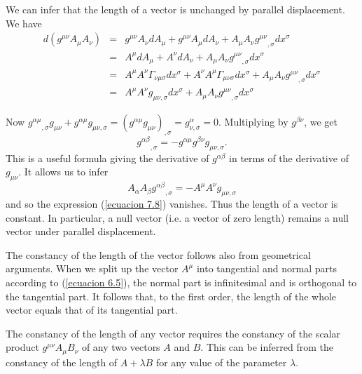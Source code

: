 We can infer that the length of a vector is unchanged by parallel displacement. 
We have
\begin{equation}
 \label{ecuacion 7.8}
 \begin{array}{rcl}
 d\left( g^{\mu\nu} A_\mu A_\nu \right) & = & 
    g^{\mu\nu} A_\nu d A_\mu + g^{\mu\nu} A_\mu d A_\nu + A_\mu A_\nu  
    {g^{\mu\nu}}_{,\sigma} dx^\sigma \\
    & = & A^\mu d A_\mu + A^\nu d A_\nu 
      + A_\mu A_\nu {g^{\mu\nu}}_{,\sigma} dx^\sigma \\
    & = & A^\mu A^\nu \Gamma_{\nu\mu\sigma} dx^\sigma 
    + A^\nu A^\mu \Gamma_{\mu\nu\sigma} dx^\sigma
    + A_\mu A_\nu {g^{\mu\nu}}_{,\sigma} dx^\sigma \\
    & = & A^\mu A^\nu g_{\mu\nu,\sigma} dx^\sigma
    + A_\mu A_\nu {g^{\mu\nu}}_{,\sigma} dx^\sigma
 \end{array}
\end{equation}

Now ${g^{\alpha\mu}}_{,\sigma} g_{\mu\nu} + g^{\alpha\mu} g_{\mu\nu,\sigma} = 
\left(g^{\alpha\mu}g_{\mu\nu}\right)_{,\sigma} = g^{\alpha}_{\nu,\sigma} = 0$. 
Multiplying by $g^{\beta\nu}$, we get
\begin{equation}
 \label{ecuacion 7.9}
 {g^{\alpha\beta}}_{,\sigma} = - g^{\alpha\mu} g^{\beta\nu}g_{\mu\nu,\sigma}.
\end{equation}
This is a useful formula giving the derivative of $g^{\alpha\beta}$ in terms 
of the derivative of $g_{\mu\nu}$. It allows us to infer
\[
 A_\alpha A_{\beta} {g^{\alpha\beta}}_{,\sigma} = - A^\mu A^\nu 
g_{\mu\nu,\sigma}
\]
and so the expression (\ref{ecuacion 7.8}) vanishes. Thus the length of a 
vector is constant. In particular, a null vector (i.e. a vector of zero length) 
remains a null vector under parallel displacement.

The constancy of the length of the vector follows also from geometrical 
arguments. When we split up the vector $A^\mu$ into tangential and normal parts 
according to (\ref{ecuacion 6.5}), the normal part is infinitesimal and is 
orthogonal to the tangential part. It follows that, to the first order, the 
length of the whole vector equals that of its tangential part.

The constancy of the length of any vector requires the constancy of the scalar 
product $g^{\mu\nu} A_\mu B_\nu$ of any two vectors $A$ and $B$. This can be 
inferred from the constancy of the length of $A + \lambda B$ for any value of 
the parameter $\lambda$.

